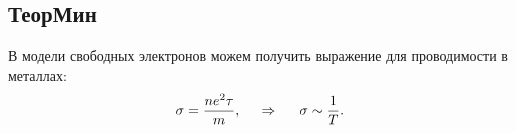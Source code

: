 \subsection*{ТеорМин}


В модели свободных электронов можем получить выражение для проводимости в металлах:
\begin{equation*}
    \sigma = \frac{n e^2 \tau}{m},
    \hspace{0.5cm} \Rightarrow \hspace{0.5cm}
    \sigma \sim \frac{1}{T}.
\end{equation*}